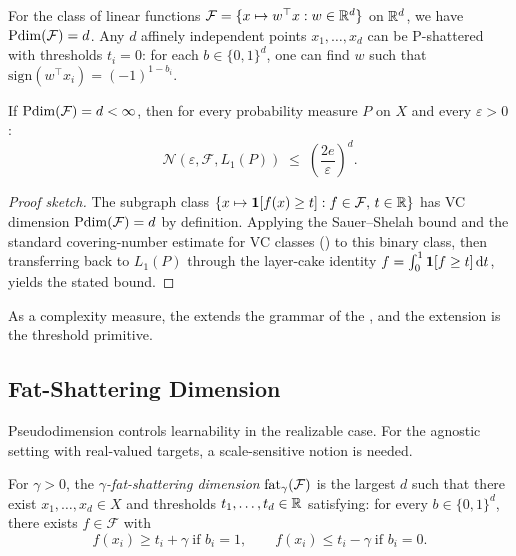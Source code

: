 \begin{example}
For the class of linear functions $\mathcal{F} = \{x \mapsto w^\top x : w \in \mathbb{R}^d\}$
on $\mathbb{R}^d$, we have $\mathrm{Pdim}(\mathcal{F}) = d$.  Any $d$ affinely independent
points $x_1, \ldots, x_d$ can be P-shattered with thresholds $t_i = 0$:
for each $b \in \{0,1\}^d$, one can find $w$ such that $\mathrm{sign}(w^\top x_i) = (-1)^{1-b_i}$.
\end{example}

\begin{prop}
\label{prop:pdim-covering}
If $\mathrm{Pdim}(\mathcal{F}) = d < \infty$, then for every probability measure
$P$ on $X$ and every $\varepsilon > 0$:
\[
  \mathcal{N}(\varepsilon, \mathcal{F}, L_1(P))
  \;\leq\; \left(\frac{2e}{\varepsilon}\right)^d.
\]
\end{prop}

\begin{proof}[Proof sketch]
The subgraph class $\{x \mapsto \mathbf{1}[f(x) \geq t] : f \in \mathcal{F},\,
t \in \mathbb{R}\}$ has VC dimension $\mathrm{Pdim}(\mathcal{F}) = d$ by definition.  Applying
the Sauer--Shelah bound and the standard covering-number estimate for VC
classes () to this binary class, then transferring
back to $L_1(P)$ through the layer-cake identity
$f = \int_0^1 \mathbf{1}[f \geq t]\,\mathrm{d}t$, yields the stated bound.
\end{proof}

As a complexity measure, the  extends the grammar of the
, and the extension is the threshold primitive.


\subsection{Fat-Shattering Dimension}

Pseudodimension controls learnability in the realizable case.  For the
agnostic setting with real-valued targets, a scale-sensitive
notion is needed.

\begin{defn}
\label{def:fat-shattering-ext}
For $\gamma > 0$, the \emph{$\gamma$-fat-shattering dimension}
$\mathrm{fat}_\gamma(\mathcal{F})$ is the largest $d$ such that there exist
$x_1, \ldots, x_d \in X$ and thresholds $t_1, \ldots, t_d \in \mathbb{R}$ satisfying:
for every $b \in \{0,1\}^d$, there exists $f \in \mathcal{F}$ with
\[
  f(x_i) \geq t_i + \gamma \;\text{if } b_i = 1,
  \qquad
  f(x_i) \leq t_i - \gamma \;\text{if } b_i = 0.
\]
\end{defn}


